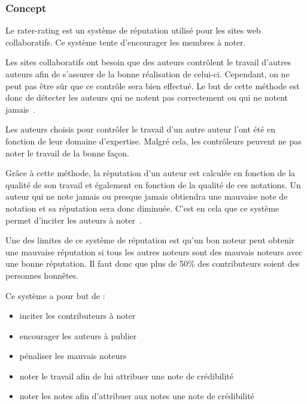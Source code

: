 \documentclass[a4paper, 11pt]{article} %
\begin{document}
\subsubsection{Concept}
Le rater-rating est un système de réputation utilisé pour les sites web collaboratifs. Ce système tente d'encourager les membres à noter.

Les sites collaboratifs ont besoin que des auteurs contrôlent le travail d'autres auteurs afin de s'assurer de la bonne réalisation de celui-ci. Cependant, on ne peut pas être sûr que ce contrôle sera bien effectué. Le but de cette méthode est donc de détecter les auteurs qui ne notent pas correctement ou qui ne notent jamais~\cite{RaterRating}.

Les auteurs choisis pour contrôler le travail d'un autre auteur l'ont été en fonction de leur domaine d'expertise. Malgré cela, les contrôleurs peuvent ne pas noter le travail de la bonne façon.

Grâce à cette méthode, la réputation d'un auteur est calculée en fonction de la qualité de son travail et également en fonction de la qualité de ces notations. Un auteur qui ne note jamais ou presque jamais obtiendra une mauvaise note de notation et sa réputation sera donc diminuée. C'est en cela que ce système permet d'inciter les auteurs à noter~\cite{RaterRating}.

Une des limites de ce système de réputation est qu'un bon noteur peut obtenir une mauvaise réputation si tous les autres noteurs sont des mauvais noteurs avec une bonne réputation. Il faut donc que plus de 50\% des contributeurs soient des personnes honnêtes.

Ce système a pour but de :
\begin{itemize}
	\item inciter les contributeurs à noter
	\item encourager les auteurs à publier
	\item pénaliser les mauvais noteurs
	\item noter le travail afin de lui attribuer une note de crédibilité
	\item noter les notes afin d'attribuer aux notes une note de crédibilité~\cite{RaterRating}
\end{itemize}
\end{document}
